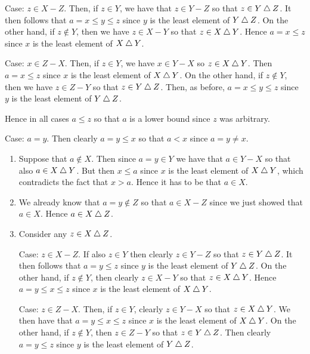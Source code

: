 {{\begin{enumerate}
            Case: $z \in X - Z$.
            Then, if $z \in Y$, we have that $z \in Y - Z$ so that $z \in Y \bigtriangleup Z$.
            It then follows that $a = x \leq y \leq z$ since $y$ is the least element of $Y \bigtriangleup Z$.
            On the other hand, if $z \notin Y$, then we have $z \in X - Y$ so that $z \in X \bigtriangleup Y$.
            Hence $a = x \leq z$ since $x$ is the least element of $X \bigtriangleup Y$.

            Case: $x \in Z - X$.
            Then, if $z \in Y$, we have $x \in Y - X$ so $z \in X \bigtriangleup Y$.
            Then $a = x \leq z$ since $x$ is the least element of $X \bigtriangleup Y$.
            On the other hand, if $z \notin Y$, then we have $z \in Z - Y$ so that $z \in Y \bigtriangleup Z$.
            Then, as before, $a = x \leq y \leq z$ since $y$ is the least element of $Y \bigtriangleup Z$.

            Hence in all cases $a \leq z$ so that $a$ is a lower bound since $z$ was arbitrary.
    \end{enumerate}

    Case: $a = y$.
    Then clearly $a = y \leq x$ so that $a < x$ since $a = y \neq x$.
    \begin{enumerate}
      \item Suppose that $a \notin X$.
            Then since $a = y \in Y$ we have that $a \in Y - X$ so that also $a \in X \bigtriangleup Y$.
            But then $x \leq a$ since $x$ is the least element of $X \bigtriangleup Y$, which contradicts the fact that $x > a$.
            Hence it has to be that $a \in X$.
      \item We already know that $a = y \notin Z$ so that $a \in X - Z$ since we just showed that $a \in X$.
            Hence $a \in X \bigtriangleup Z$.
      \item Consider any $z \in X \bigtriangleup Z$.

            Case: $z \in X - Z$.
            If also $z \in Y$ then clearly $z \in Y - Z$ so that $z \in Y \bigtriangleup Z$.
            It then follows that $a = y \leq z$ since $y$ is the least element of $Y \bigtriangleup Z$.
            On the other hand, if $z \notin Y$, then clearly $z \in X - Y$ so that $z \in X \bigtriangleup Y$.
            Hence $a = y \leq x \leq z$ since $x$ is the least element of $X \bigtriangleup Y$.

            Case: $z \in Z - X$.
            Then, if $z \in Y$, clearly $z \in Y - X$ so that $z \in X \bigtriangleup Y$.
            We then have that $a = y \leq x \leq z$ since $x$ is the least element of $X \bigtriangleup Y$.
            On the other hand, if $z \notin Y$, then $z \in Z - Y$ so that $z \in Y \bigtriangleup Z$.
            Then clearly $a = y \leq z$ since $y$ is the least element of $Y \bigtriangleup Z$.


\end{enumerate}}}
